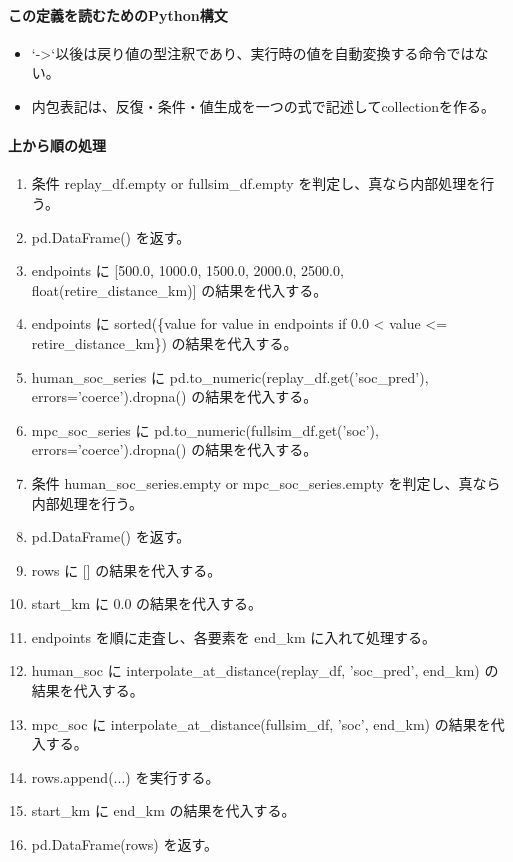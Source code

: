 \documentclass[a4paper,11pt]{article}
\begin{document}
            \paragraph{この定義を読むためのPython構文}
            \begin{itemize}[leftmargin=1.6em]
            \item `->`以後は戻り値の型注釈であり、実行時の値を自動変換する命令ではない。
\item 内包表記は、反復・条件・値生成を一つの式で記述してcollectionを作る。
            \end{itemize}
            \paragraph{上から順の処理}
            \begin{enumerate}[leftmargin=1.8em]
            \item 条件 replay\_df.empty or fullsim\_df.empty を判定し、真なら内部処理を行う。
\item   pd.DataFrame() を返す。
\item endpoints に [500.0, 1000.0, 1500.0, 2000.0, 2500.0, float(retire\_distance\_km)] の結果を代入する。
\item endpoints に sorted(\{value for value in endpoints if 0.0 < value <= retire\_distance\_km\}) の結果を代入する。
\item human\_soc\_series に pd.to\_numeric(replay\_df.get('soc\_pred'), errors='coerce').dropna() の結果を代入する。
\item mpc\_soc\_series に pd.to\_numeric(fullsim\_df.get('soc'), errors='coerce').dropna() の結果を代入する。
\item 条件 human\_soc\_series.empty or mpc\_soc\_series.empty を判定し、真なら内部処理を行う。
\item   pd.DataFrame() を返す。
\item rows に [] の結果を代入する。
\item start\_km に 0.0 の結果を代入する。
\item endpoints を順に走査し、各要素を end\_km に入れて処理する。
\item   human\_soc に interpolate\_at\_distance(replay\_df, 'soc\_pred', end\_km) の結果を代入する。
\item   mpc\_soc に interpolate\_at\_distance(fullsim\_df, 'soc', end\_km) の結果を代入する。
\item   rows.append(...) を実行する。
\item   start\_km に end\_km の結果を代入する。
\item pd.DataFrame(rows) を返す。
            \end{enumerate}
\end{document}

